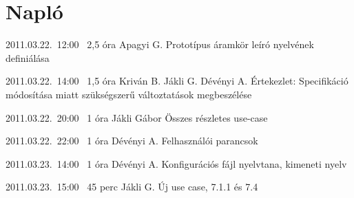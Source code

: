 %
\section{Napló}

\begin{naplo}

\bejegyzes
{2011.03.22.~12:00~} %
{2,5 óra} %
{Apagyi G.} %
{Prototípus áramkör leíró nyelvének definiálása} %

\bejegyzes
{2011.03.22.~14:00~}
{1,5 óra}
{Kriván B.\newline
Jákli G.\newline
Dévényi A.}
{Értekezlet: Specifikáció módosítása miatt szükségszerű változtatások megbeszélése}

\bejegyzes
{2011.03.22.~20:00~}
{1 óra}
{Jákli Gábor}
{Összes részletes use-case}

\bejegyzes
{2011.03.22.~22:00~}
{1 óra}
{Dévényi A.}
{Felhasználói parancsok}

\bejegyzes
{2011.03.23.~14:00~}
{1 óra}
{Dévényi A.}
{Konfigurációs fájl nyelvtana, kimeneti nyelv}

\bejegyzes
{2011.03.23.~15:00~}
{45 perc}
{Jákli G.}
{Új use case, 7.1.1 és 7.4}


\end{naplo}

